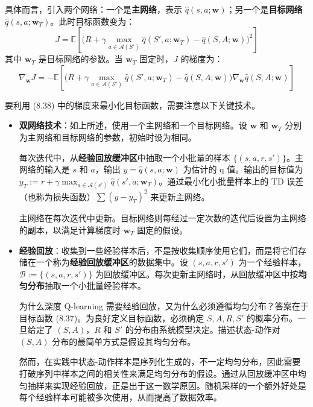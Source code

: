 \documentclass[UTF8]{article}
\begin{document}
具体而言，引入两个网络：一个是\textbf{主网络}，表示 $\hat{q}(s, a; \boldsymbol{w})$；另一个是\textbf{目标网络} $\hat{q}(s, a; \boldsymbol{w}_T)$。此时目标函数变为：
\begin{equation}
\label{eq:dqn_obj_target}
J = \mathbb{E}\left[\Big(R + \gamma \max_{a \in \mathcal{A}(S')} \hat{q}(S', a; \boldsymbol{w}_T) - \hat{q}(S, A; \boldsymbol{w})\Big)^2\right]
\end{equation}
其中 $\boldsymbol{w}_T$ 是目标网络的参数。当 $\boldsymbol{w}_T$ 固定时，$J$ 的梯度为：
\begin{equation}
\label{eq:dqn_grad}
\nabla_{\boldsymbol{w}} J = -\mathbb{E}\left[\Big(R + \gamma \max_{a \in \mathcal{A}(S')} \hat{q}(S', a; \boldsymbol{w}_T) - \hat{q}(S, A; \boldsymbol{w})\Big) \nabla_{\boldsymbol{w}} \hat{q}(S, A; \boldsymbol{w})\right]
\end{equation}

要利用 (8.38) 中的梯度来最小化目标函数，需要注意以下关键技术。

\begin{itemize}
    \item \textbf{双网络技术}：如上所述，使用一个主网络和一个目标网络。设 $\boldsymbol{w}$ 和 $\boldsymbol{w}_T$ 分别为主网络和目标网络的参数，初始时设为相同。
    
    每次迭代中，从\textbf{经验回放缓冲区}中抽取一个小批量的样本 $\{(s, a, r, s')\}$。主网络的输入是 $s$ 和 $a$，输出 $y = \hat{q}(s, a; \boldsymbol{w})$ 为估计的 q 值。输出的目标值为 $y_T := r + \gamma \max_{a \in \mathcal{A}(s')} \hat{q}(s', a; \boldsymbol{w}_T)$。通过最小化小批量样本上的 TD 误差（也称为损失函数）$\sum (y - y_T)^2$ 来更新主网络。
    
    主网络在每次迭代中更新。目标网络则每经过一定次数的迭代后设置为主网络的副本，以满足计算梯度时 $\boldsymbol{w}_T$ 固定的假设。
    
    \item \textbf{经验回放}：收集到一些经验样本后，不是按收集顺序使用它们，而是将它们存储在一个称为\textbf{经验回放缓冲区}的数据集中。设 $(s, a, r, s')$ 为一个经验样本，$\mathcal{B} := \{(s, a, r, s')\}$ 为回放缓冲区。每次更新主网络时，从回放缓冲区中按\textbf{均匀分布}抽取一个小批量经验样本。
    
    为什么深度 Q-learning 需要经验回放，又为什么必须遵循均匀分布？答案在于目标函数 (8.37)。为良好定义目标函数，必须确定 $S, A, R, S'$ 的概率分布。一旦给定了 $(S, A)$，$R$ 和 $S'$ 的分布由系统模型决定。描述状态-动作对 $(S, A)$ 分布的最简单方式是假设其均匀分布。
    
    然而，在实践中状态-动作样本是序列化生成的，不一定均匀分布，因此需要打破序列中样本之间的相关性来满足均匀分布的假设。通过从回放缓冲区中均匀抽样来实现经验回放，正是出于这一数学原因。随机采样的一个额外好处是每个经验样本可能被多次使用，从而提高了数据效率。
\end{itemize}
\end{document}
